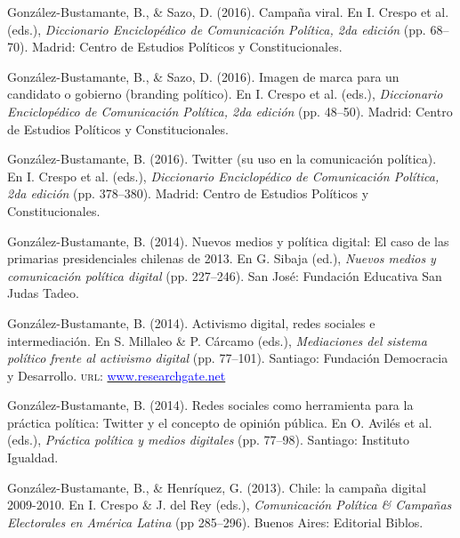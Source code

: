 \begin{publications}
\begin{benumerate}{12}
\item{\small González-Bustamante, B., \& Sazo, D. (2016). Campaña viral. En I. Crespo et al. (eds.), {\itshape Diccionario Enciclopédico de Comunicación Política, 2da edición} (pp. 68--70). Madrid: Centro de Estudios Políticos y Constitucionales.}\vspace{1mm}

\item{\small González-Bustamante, B., \& Sazo, D. (2016). Imagen de marca para un candidato o gobierno (branding político). En I. Crespo et al. (eds.), {\itshape Diccionario Enciclopédico de Comunicación Política, 2da edición} (pp. 48--50). Madrid: Centro de Estudios Políticos y Constitucionales.}\vspace{1mm}

\item{\small González-Bustamante, B. (2016). Twitter (su uso en la comunicación política). En I. Crespo et al. (eds.), {\itshape Diccionario Enciclopédico de Comunicación Política, 2da edición} (pp. 378--380). Madrid: Centro de Estudios Políticos y Constitucionales.}\vspace{1mm}

\item{\small González-Bustamante, B. (2014). Nuevos medios y política digital: El caso de las primarias presidenciales chilenas de 2013. En G. Sibaja (ed.), {\itshape Nuevos  medios y comunicación política digital} (pp. 227--246). San José: Fundación Educativa San Judas Tadeo.}\vspace{1mm}

\item{\small González-Bustamante, B. (2014). Activismo digital, redes sociales e intermediación. En S. Millaleo \& P. C\'arcamo (eds.), {\itshape Mediaciones del  sistema político frente al activismo digital} (pp. 77--101). Santiago: Fundación Democracia y Desarrollo. {\scshape url:} \href{https://www.researchgate.net/publication/321992867_Activismo_digital_redes_sociales_e_intermediacion}{\textcolor{blue}{www.researchgate.net}}}\vspace{1mm}

\item{\small González-Bustamante, B. (2014). Redes sociales como herramienta para la práctica política: Twitter y el concepto de opinión pública. En O. Avilés et al. (eds.), {\itshape Práctica política y medios digitales} (pp. 77--98). Santiago: Instituto Igualdad.}\vspace{1mm}

\item{\small González-Bustamante, B., \& Henríquez, G. (2013). Chile: la campaña digital 2009-2010. En I. Crespo \& J. del Rey (eds.), {\itshape Comunicación Política \& Campañas Electorales en América Latina} (pp 285--296). Buenos Aires: Editorial Biblos.}\vspace{1mm}

\end{benumerate}

\end{publications}
\pagebreak